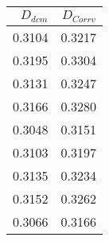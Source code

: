 \begin{tabular}{rr}
\toprule
$D_{dcm}$ & $D_{Corrv}$ \\
\midrule
0.3104 & 0.3217 \\
0.3195 & 0.3304 \\
0.3131 & 0.3247 \\
0.3166 & 0.3280 \\
0.3048 & 0.3151 \\
0.3103 & 0.3197 \\
0.3135 & 0.3234 \\
0.3152 & 0.3262 \\
0.3066 & 0.3166 \\
\bottomrule
\end{tabular}
